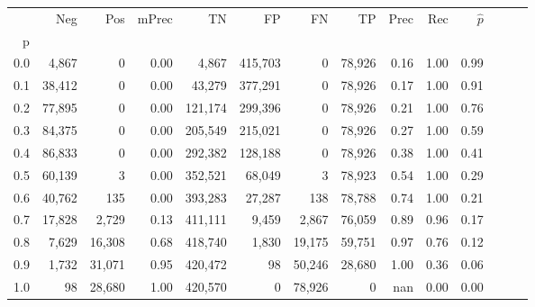 \begin{tabular}{rrrrrrrrrrrrrr}
\toprule
{} &     Neg &     Pos & mPrec &       TN &       FP &      FN &      TP &  Prec &   Rec & $\hat{p}$ \\
p   &         &         &       &          &          &         &         &       &       &           \\
\midrule
0.0 &   4,867 &       0 &  0.00 &    4,867 &  415,703 &       0 &  78,926 &  0.16 &  1.00 &      0.99 \\
0.1 &  38,412 &       0 &  0.00 &   43,279 &  377,291 &       0 &  78,926 &  0.17 &  1.00 &      0.91 \\
0.2 &  77,895 &       0 &  0.00 &  121,174 &  299,396 &       0 &  78,926 &  0.21 &  1.00 &      0.76 \\
0.3 &  84,375 &       0 &  0.00 &  205,549 &  215,021 &       0 &  78,926 &  0.27 &  1.00 &      0.59 \\
0.4 &  86,833 &       0 &  0.00 &  292,382 &  128,188 &       0 &  78,926 &  0.38 &  1.00 &      0.41 \\
0.5 &  60,139 &       3 &  0.00 &  352,521 &   68,049 &       3 &  78,923 &  0.54 &  1.00 &      0.29 \\
0.6 &  40,762 &     135 &  0.00 &  393,283 &   27,287 &     138 &  78,788 &  0.74 &  1.00 &      0.21 \\
0.7 &  17,828 &   2,729 &  0.13 &  411,111 &    9,459 &   2,867 &  76,059 &  0.89 &  0.96 &      0.17 \\
0.8 &   7,629 &  16,308 &  0.68 &  418,740 &    1,830 &  19,175 &  59,751 &  0.97 &  0.76 &      0.12 \\
0.9 &   1,732 &  31,071 &  0.95 &  420,472 &       98 &  50,246 &  28,680 &  1.00 &  0.36 &      0.06 \\
1.0 &      98 &  28,680 &  1.00 &  420,570 &        0 &  78,926 &       0 &   nan &  0.00 &      0.00 \\
\bottomrule
\end{tabular}
